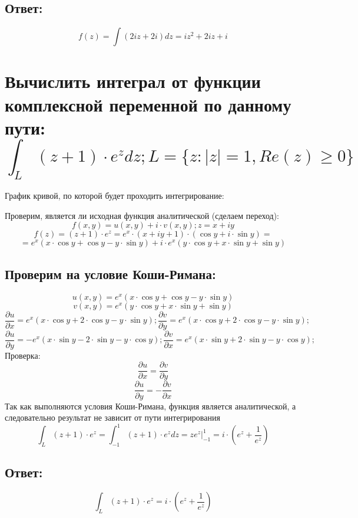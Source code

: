 \documentclass[12pt]{article}
\begin{document}
\subsection*{Ответ:} 
$$f(z) = \int(2iz + 2i)dz = iz^2 + 2iz + i$$

\section{Вычислить интеграл от функции комплексной переменной по данному пути: $$\int_L (z + 1) \cdot e^z dz; L = \{z: |z| = 1, Re(z) \geq 0\}$$}
График кривой, по которой будет проходить интегрирование:
\begin{center}
\end{center}
\FloatBarrier
Проверим, является ли исходная функция аналитической (сделаем переход):
$$f(x,y) = u(x,y) + i\cdot v(x,y);   z = x + iy$$
$$f(z) = (z + 1) \cdot e^z = e^x \cdot (x + iy + 1) \cdot (\cos{y} + i \cdot \sin{y}) = $$
$$= e^x (x \cdot \cos{y} + \cos{y} - y \cdot \sin{y}) + i \cdot e^x (y \cdot \cos{y} + x \cdot \sin{y} + \sin{y})$$
\subsection*{Проверим на условие Коши-Римана:}
$$u(x,y) = e^x (x \cdot \cos{y} + \cos{y} - y \cdot \sin{y})$$
$$v(x,y) = e^x (y \cdot \cos{y} + x \cdot \sin{y} + \sin{y})$$
$$\frac{\partial u}{\partial x} = e^x (x \cdot \cos{y} + 2 \cdot \cos{y} - y \cdot \sin{y}); \frac{\partial v}{\partial y} = e^x (x \cdot \cos{y} + 2 \cdot \cos{y} - y \cdot \sin{y});$$
$$\frac{\partial u}{\partial y} = - e^x (x \cdot \sin{y} - 2 \cdot \sin{y} - y \cdot \cos{y});\frac{\partial v}{\partial x} = e^x (x \cdot \sin{y} + 2 \cdot \sin{y} - y \cdot \cos{y});$$
Проверка:
$$ \frac{\partial u}{\partial x} = \frac{\partial v}{\partial y}$$
$$\frac{\partial u}{\partial y} = - \frac{\partial v}{\partial x}$$
Так как выполняются условия Коши-Римана, функция является аналитической, а следовательно результат не зависит от пути интегрирования\\
$$\int_L (z + 1) \cdot e^z = \int^1_{-1} (z + 1) \cdot e^z dz = ze^z \bigg| _{-1}^1 = i \cdot (e^z + \frac{1}{e^z})$$
\subsection*{Ответ:} 
$$\int_L (z + 1) \cdot e^z = i \cdot (e^z + \frac{1}{e^z})$$
\end{document}
